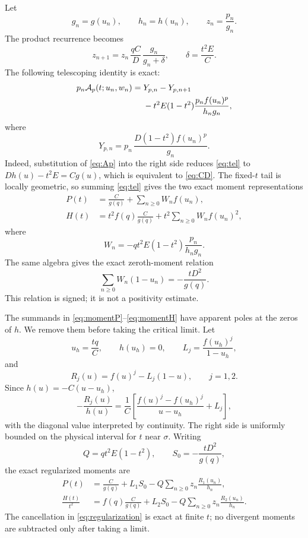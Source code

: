 \documentclass[11pt]{article}
\theoremstyle{definition}
\theoremstyle{remark}
\begin{document}
Let
\[
  g_n=g(u_n),\qquad h_n=h(u_n),\qquad z_n=\frac{p_n}{g_n}.
\]
The product recurrence becomes
\begin{equation}\label{eq:zrec}
  z_{n+1}
   =z_n\,\frac{qC}{D}\,
     \frac{g_n}{g_n+\delta},
  \qquad
  \delta=\frac{t^2E}{C}.
\end{equation}
The following telescoping identity is exact:
\begin{equation}\label{eq:tel}
\begin{aligned}
 p_n{\cal A}_p(t;u_n,w_n)
  ={}&Y_{p,n}-Y_{p,n+1}\\
   &-t^2E(1-t^2)\frac{p_nf(u_n)^p}{h_ng_n},
\end{aligned}
\end{equation}
where
\[
  Y_{p,n}=p_n\,\frac{D(1-t^2)f(u_n)^p}{g_n}.
\]
Indeed, substitution of \eqref{eq:Ap} into the right side reduces
\eqref{eq:tel} to \(Dh(u)-t^2E=Cg(u)\), which is equivalent to
\eqref{eq:CD}.  The fixed-\(t\) tail is locally geometric, so summing
\eqref{eq:tel} gives the two exact moment representations
\begin{align}
 P(t)&=\frac{C}{g(q)}
       +\sum_{n\geq0}W_nf(u_n),                              \label{eq:momentP}\\
 H(t)&=t^2f(q)\frac{C}{g(q)}
       +t^2\sum_{n\geq0}W_nf(u_n)^2,                         \label{eq:momentH}
\end{align}
where
\begin{equation}\label{eq:W}
  W_n=-qt^2E(1-t^2)\frac{p_n}{h_ng_n}.
\end{equation}
The same algebra gives the exact zeroth-moment relation
\begin{equation}\label{eq:zeromoment}
  \sum_{n\geq0}W_n(1-u_n)=-\frac{tD^2}{g(q)}.
\end{equation}
This relation is signed; it is not a positivity estimate.

The summands in \eqref{eq:momentP}--\eqref{eq:momentH} have apparent poles at
the zeros of \(h\).  We remove them before taking the critical limit.  Let
\[
  u_h=\frac{tq}{C},\qquad h(u_h)=0,
  \qquad
  L_j=\frac{f(u_h)^j}{1-u_h},
\]
and
\[
  R_j(u)=f(u)^j-L_j(1-u),\qquad j=1,2.
\]
Since \(h(u)=-C(u-u_h)\),
\begin{equation}\label{eq:regularization}
 -\frac{R_j(u)}{h(u)}
 =
 \frac{1}{C}\left[
   \frac{f(u)^j-f(u_h)^j}{u-u_h}+L_j
 \right],
\end{equation}
with the diagonal value interpreted by continuity.  The right side is
uniformly bounded on the physical interval for \(t\) near \(\sigma\).
Writing
\[
  Q=qt^2E(1-t^2),\qquad S_0=-\frac{tD^2}{g(q)},
\]
the exact regularized moments are
\begin{align}
 P(t)
  &=\frac{C}{g(q)}+L_1S_0
    -Q\sum_{n\geq0}z_n\frac{R_1(u_n)}{h_n},                  \label{eq:regP}\\
 \frac{H(t)}{t^2}
  &=f(q)\frac{C}{g(q)}+L_2S_0
    -Q\sum_{n\geq0}z_n\frac{R_2(u_n)}{h_n}.                  \label{eq:regH}
\end{align}
The cancellation in \eqref{eq:regularization} is exact at finite \(t\);
no divergent moments are subtracted only after taking a limit.
\end{document}
